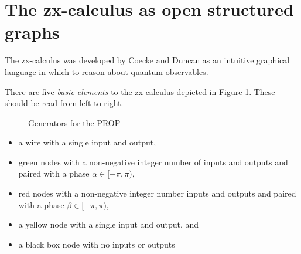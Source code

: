 \documentclass[11pt]{amsart}
\theoremstyle{remark}
\theoremstyle{definition}
\begin{document}
\section{The zx-calculus as open structured graphs}
\label{sec:ZxCalc}

The zx-calculus was developed by Coecke and Duncan   as an intuitive graphical language in which to reason about quantum observables.  

There are five \textit{basic elements} to the zx-calculus depicted in Figure \ref{fig:ZX generators}. These should be read from left to right.
\begin{figure}
	\caption{Generators for the PROP}
	\label{fig:ZX generators}
\end{figure}
\begin{itemize}
	\item a wire with a single input and output,
	\item green nodes with a non-negative integer number of inputs and outputs and paired with a phase $\alpha \in [-\pi,\pi)$,
	\item red nodes with a non-negative integer number inputs and outputs and paired with a phase $\beta \in [-\pi,\pi)$,
	\item a yellow node with a single input and output, and
	\item a black box node with no inputs or outputs
\end{itemize}
\end{document}
